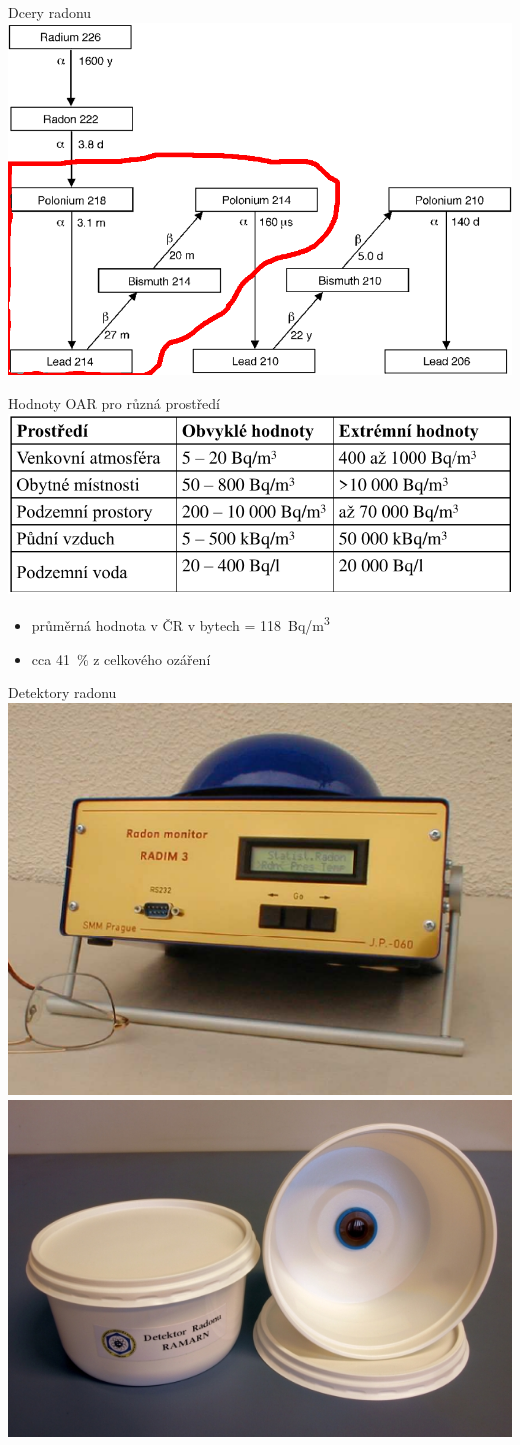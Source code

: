 \documentclass[10pt]{beamer}
\begin{document}
\begin{frame}{Dcery radonu}
    \small
    \centering
    \includegraphics[width=.8\textwidth]{radon_chain.png}
\end{frame}

\begin{frame}{Hodnoty OAR pro různá prostředí}
    \small
    \centering
    \includegraphics[width=.8\textwidth]{tabulka_hodnoty_radonu.png}
    \cite{fronka}
    \begin{itemize}
        \item průměrná hodnota v ČR v bytech = \SI{118}{Bq/m^3}
        \item cca \SI{41}{\%} z celkového ozáření
    \end{itemize}
\end{frame}

\begin{frame}{Detektory radonu}
    \small
    \centering
    \includegraphics[width=.45\textwidth]{radim.png}\cite{radim}
    \includegraphics[width=.45\textwidth]{stopac.jpg}
\end{frame}
\end{document}
